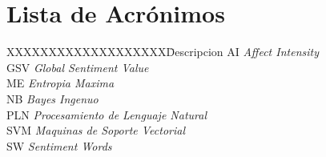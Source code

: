 \chapter*{Lista de Acr\'onimos}\label{acronimos}

\begin{tabbing}
XXXXXXXXXXXXXXXXXXX\=Descripcion\kill
AI \> {\it Affect Intensity }\\
GSV \> {\it Global Sentiment Value }\\
ME \> {\it Entropia Maxima}\\
NB \> {\it Bayes Ingenuo }\\
PLN \> {\it Procesamiento de Lenguaje Natural}\\
SVM \> {\it Maquinas de Soporte Vectorial}\\
SW \> {\it Sentiment Words }\\
\end{tabbing}